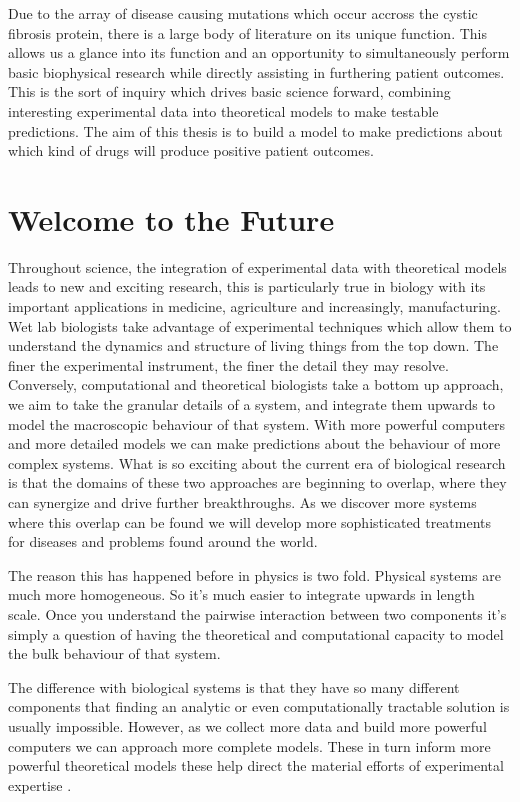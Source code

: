 Due to the array of disease causing mutations which occur accross the cystic fibrosis protein, there is a large body of literature on its unique function. This allows us a glance into its function and an opportunity to simultaneously perform basic biophysical research while directly assisting in furthering patient outcomes. This is the sort of inquiry which drives basic science forward, combining interesting experimental data into theoretical models to make testable predictions. The aim of this thesis is to build a model to make predictions about which kind of drugs will produce positive patient outcomes.

\section{Welcome to the Future}
Throughout science, the integration of experimental data with theoretical models leads to new and exciting research, this is particularly true in biology with its important applications in medicine, agriculture and increasingly, manufacturing. Wet lab biologists take advantage of experimental techniques which allow them to understand the dynamics and structure of living things from the top down. The finer the experimental instrument, the finer the detail they may resolve. Conversely, computational and theoretical biologists take a bottom up approach, we aim to take the granular details of a system, and integrate them upwards to model the macroscopic behaviour of that system. With more powerful computers and more detailed models we can make predictions about the behaviour of more complex systems. What is so exciting about the current era of biological research is that the domains of these two approaches are beginning to overlap, where they can synergize  and drive further breakthroughs. As we discover more systems where this overlap can be found we will develop more sophisticated treatments for diseases and problems found around the world.

The reason this has happened before in physics is two fold. Physical systems are much more homogeneous. So it's much easier to integrate upwards in length scale. Once you understand the pairwise interaction between two components it's simply a question of having the theoretical and computational capacity to model the bulk behaviour of that system. 

The difference with biological systems is that they have so many different components that finding an analytic or even computationally tractable solution is usually impossible. However, as we collect more data and build more powerful computers we can approach more complete models. These in turn inform more powerful theoretical models these help direct the material efforts of experimental expertise . 

